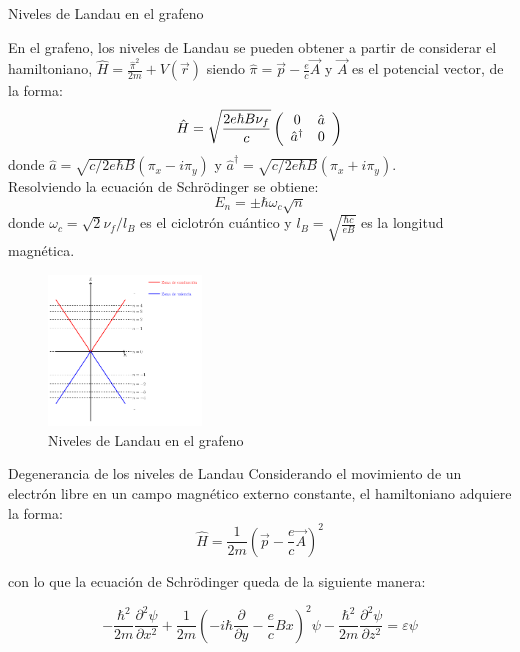 \begin{frame}{Niveles de Landau en el grafeno}
	\begin{multicols}{2}
		\scriptsize{En el grafeno, los niveles de Landau se pueden obtener a partir de considerar el hamiltoniano,
						$\hat{H}=\frac{\hat{\pi}^2}{2m}+V(\vec{r})$ siendo $\hat{\pi}=\vec{p}- \frac{e}{c}\vec{A}$
						y $\vec{A}$ es el potencial vector, de la forma:
			\begin{equation}
					\hat{H} = \sqrt{\frac{2e\hbar B \nu_f}{c}}
					\left( \begin{array}{c c}
							0&\hat{a}\\
							\hat{a}^\dagger&0
					\end{array} \right)
			\end{equation}
			donde $\hat{a}= \sqrt{c/2e\hbar B}(\pi_x-i\pi_y)$ y 	$\hat{a}^\dagger=\sqrt{c/2e\hbar B}(\pi_x+i\pi_y)$.\\
			Resolviendo la ecuación de Schrödinger se obtiene:
			\begin{equation}
					E_n= \pm \hbar\omega_c \sqrt{n}
			\end{equation}
			donde $\omega_c = \sqrt{2}\nu_f/l_B$ es el ciclotrón cuántico y $l_B = \sqrt{\frac{\hbar c}{e B}}$ es la longitud magnética.}
		\begin{figure}
			\includegraphics[height=4cm]{graficas/LL_grafeno.png}
			\caption{\scriptsize{Niveles de Landau en el grafeno}}
		\end{figure}
	\end{multicols}
\end{frame}

\begin{frame}{Degenerancia de los niveles de Landau}
	Considerando el movimiento de un electrón libre en un campo magnético externo constante,
	el hamiltoniano adquiere la forma:
	\begin{equation}
		\hat{H} = \frac{1}{2m}\left( \vec{p}-\frac{e}{c}\vec{A} \right)^2
		\label{hamil_nr}
	\end{equation}

	con lo que la ecuación de Schrödinger queda de la siguiente manera:

	\begin{equation}
			-\frac{\hbar^2}{2m}\frac{\partial^2\psi}{\partial x^2} + \frac{1}{2m} \left( -i\hbar \frac{\partial}{\partial y} -\frac{e}{c}Bx \right)^2 \psi - \frac{\hbar^2}{2m} \frac{\partial^2\psi}{\partial z^2} = \varepsilon \psi
			\label{sch_nr}
	\end{equation}
\end{frame}

